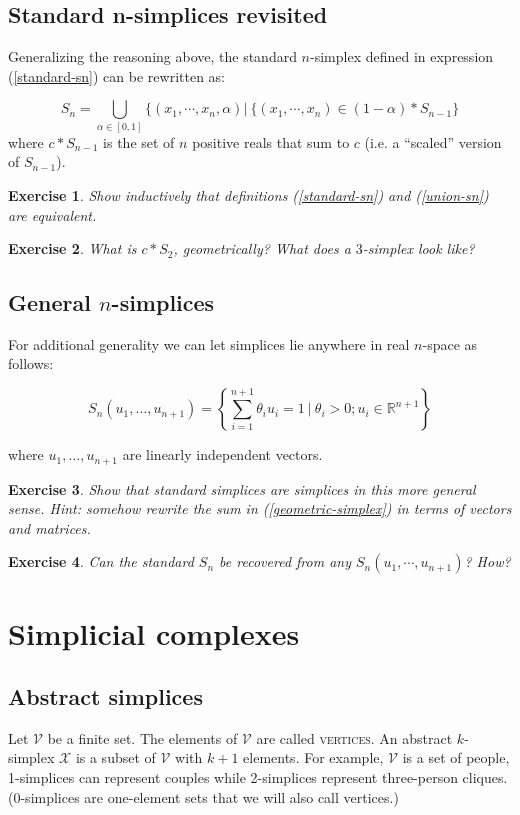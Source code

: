 \documentclass{tufte-handout}
\newtheorem{exercise}{Exercise}
\newcommand{\define}{\textsc}
\newcommand{\re}{\mathbb{R}}
\newcommand{\ve}{\mathcal{V}}
\begin{document}
\subsection{Standard n-simplices revisited}
Generalizing the reasoning above, the standard $n$-simplex defined in expression (\ref{standard-sn}) can be rewritten as:


\begin{equation}
    S_n = \bigcup_{\alpha\in[0,1]} \{(x_1,\cdots,x_n,\alpha) | \ \{(x_1,\cdots,x_n)\in (1-\alpha)*S_{n-1}  \}
\label{union-sn}
\end{equation}
where $c*S_{n-1}$ is the set of $n$ positive reals that sum to $c$ (i.e. a ``scaled'' version of $S_{n-1}$).
\begin{exercise}
Show inductively that definitions (\ref{standard-sn}) and (\ref{union-sn}) are equivalent.
\end{exercise}
\begin{exercise}
What is $c*S_2$, geometrically? What does a $3$-simplex look like?
\end{exercise}
\subsection{General $n$-simplices}
For additional generality we can let simplices lie anywhere in real $n$-space as follows:

\begin{equation}
    S_{n}(u_1,\ldots,u_{n+1}) = \left\{\sum_{i=1}^{n+1} \theta_i u_i = 1\ |\  \theta_i>0; u_i\in \re^{n+1} \right\}
    \label{geometric-simplex}
\end{equation}

where $u_1,\ldots,u_{n+1}$ are linearly independent vectors. 

\begin{exercise}
Show that standard simplices are simplices in this more general sense. Hint: somehow rewrite the sum in (\ref{geometric-simplex}) in terms of vectors and matrices.
\end{exercise}
\begin{exercise}
Can the standard $S_n$ be recovered from any $S_n(u_1,\cdots,u_{n+1})$? How?
\end{exercise}

\section{Simplicial complexes}
\subsection{Abstract simplices}
\newcommand{\se}{\mathcal X}
\renewcommand{\sc}{\mathcal C}
Let $\ve$ be a finite set. The elements of $\ve$ are called \define{vertices}. An abstract $k$-simplex $\se$ is a subset of $\ve$ with $k+1$ elements. For example, $\ve$ is a set of people, 1-simplices can represent couples while 2-simplices represent three-person cliques. ($0$-simplices are one-element sets that we will also call vertices.)
\end{document}
